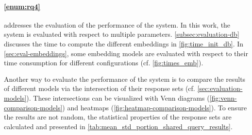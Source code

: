 \paragraph{\ref{enum:rq4}} addresses the evaluation of the performance of the system.
In this work, the system is evaluated with respect to multiple parameters.
\autoref{subsec:evaluation-db} discusses 
the time to compute the different embeddings in \autoref{fig:time_init_db}.
In \autoref{sec:eval-embeddings}, some embedding models are evaluated 
with respect to their time consumption for different configurations (cf. \autoref{fig:times_emb}).

Another way to evaluate the performance of the system is to 
compare the results of different models via the intersection 
of their response sets (cf. \autoref{sec:evaluation-models}).
These intersections can be visualized with Venn diagrams (\autoref{fig:venn-comparison-models}) 
and heatmaps (\autoref{fig:heatmap-comparison-models}).
To ensure the results are not random, 
the statistical properties of the response sets are calculated 
and presented in \autoref{tab:mean_std_portion_shared_query_results}.